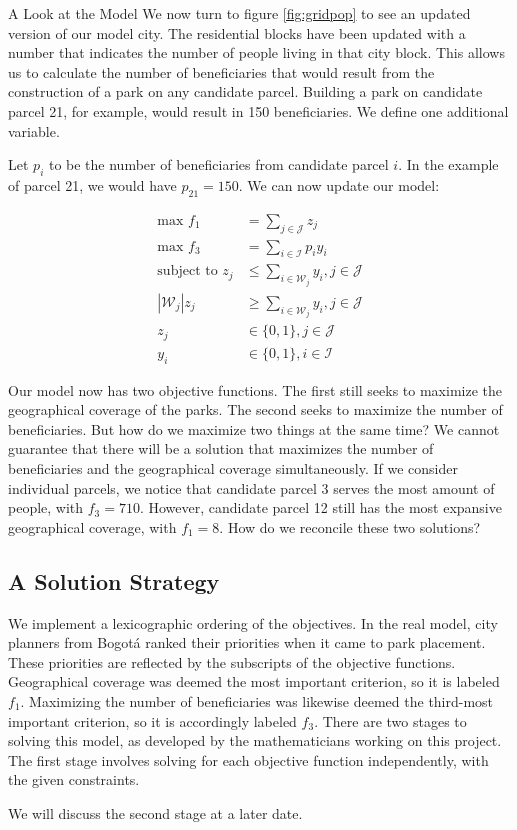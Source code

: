 \documentclass[12pt]{pom_thesis}
\begin{document}
\begin{chapter}{A Look at the Model}
	We now turn to figure \ref{fig:gridpop} to see an updated version of our model city. The residential blocks have been updated with a number that indicates the number of people living in that city block. This allows us to calculate the number of beneficiaries that would result from the construction of a park on any candidate parcel. Building a park on candidate parcel 21, for example, would result in 150 beneficiaries. We define one additional variable.
	
	Let $p_i$ to be the number of beneficiaries from candidate parcel $i$. In the example of parcel 21, we would have $p_{21} = 150$. We can now update our model:

\begin{align*}
\textrm{max } f_1 &= \sum_{j \in \mathcal{J}} z_j \\
\textrm{max } f_3 &= \sum_{i \in \mathcal{I}} p_iy_i \\
\textrm{subject to } z_j &\leq \sum_{i \in \mathcal{W}_j} y_i, j \in \mathcal{J}\\
\left|\mathcal{W}_j\right|z_j &\geq \sum_{i \in \mathcal{W}_j} y_i, j \in \mathcal{J} \\
z_j &\in \{0,1\}, j \in \mathcal{J} \\
y_i &\in \{0,1\}, i \in \mathcal{I}
\end{align*}

	Our model now has two objective functions. The first still seeks to maximize the geographical coverage of the parks. The second seeks to maximize the number of beneficiaries. But how do we maximize two things at the same time? We cannot guarantee that there will be a solution that maximizes the number of beneficiaries and the geographical coverage simultaneously. If we consider individual parcels, we notice that candidate parcel 3 serves the most amount of people, with $f_3 = 710$. However, candidate parcel 12 still has the most expansive geographical coverage, with $f_1 = 8$. How do we reconcile these two solutions?

\subsection{A Solution Strategy}

	We implement a lexicographic ordering of the objectives. In the real model, city planners from Bogot\'{a} ranked their priorities when it came to park placement. These priorities are reflected by the subscripts of the objective functions. Geographical coverage was deemed the most important criterion, so it is labeled $f_1$. Maximizing the number of beneficiaries was likewise deemed the third-most important criterion, so it is accordingly labeled $f_3$. There are two stages to solving this model, as developed by the mathematicians working on this project. The first stage involves solving for each objective function independently, with the given constraints.
	
	We will discuss the second stage at a later date.
\end{chapter}
\end{document}
